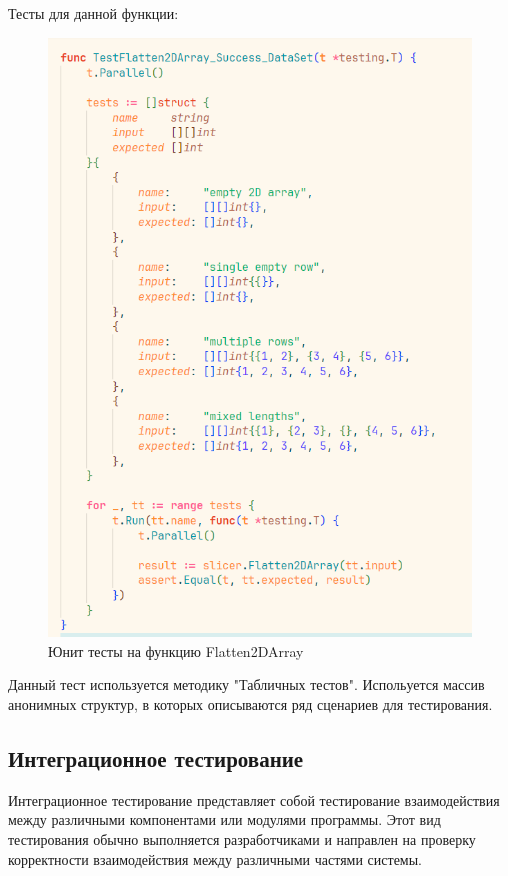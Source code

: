 Тесты для данной функции:
\begin{figure}[H]%
	\begin{center}
		\includegraphics[width=.9\columnwidth]{./img/new/test_slice_2.png}%
	\end{center}
	\caption{Юнит тесты на функцию Flatten2DArray}%
	\label{pic:test_slice_2}%
\end{figure}

Данный тест используется методику "Табличных тестов". Испольуется массив анонимных структур, в которых описываются ряд сценариев
для тестирования.

\subsection{Интеграционное тестирование}
Интеграционное тестирование представляет собой тестирование взаимодействия между различными компонентами или модулями программы. 
Этот вид тестирования обычно выполняется разработчиками и направлен на проверку корректности взаимодействия между различными частями системы.\\

